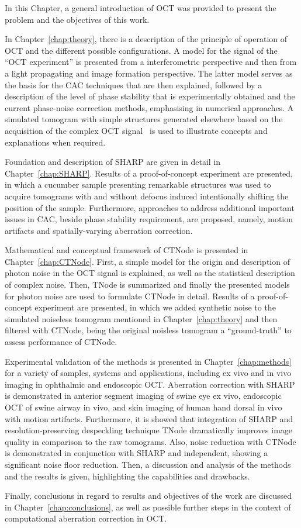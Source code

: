 In this Chapter, a general introduction of OCT was provided to present the problem and the objectives of this work.

In Chapter~\ref{chap:theory}, there is a description of the principle of operation of OCT and the different possible configurations. A model for the signal of the ``OCT experiment'' is presented from a interferometric perspective and then from a light propagating and image formation perspective. The latter model serves as the basis for the CAC techniques that are then explained, followed by a description of the level of phase stability that is experimentally obtained and the current phase-noise correction methods, emphasising in numerical approaches. A simulated tomogram with simple structures generated elsewhere based on the acquisition of the complex OCT signal~\cite{} is used to illustrate concepts and explanations when required.

Foundation and description of SHARP are given in detail in Chapter~\ref{chap:SHARP}. Results of a proof-of-concept experiment are presented, in which a cucumber sample presenting remarkable structures was used to acquire tomograms with and without defocus induced intentionally shifting the position of the sample. Furthermore, approaches to address additional important issues in CAC, beside phase stability requirement, are proposed, namely, motion artifacts and spatially-varying aberration correction.

Mathematical and conceptual framework of CTNode is presented in Chapter~\ref{chap:CTNode}. First, a simple model for the origin and description of photon noise in the OCT signal is explained, as well as the statistical description of complex noise. Then, TNode is summarized and finally the presented models for photon noise are used to formulate CTNode in detail. Results of a proof-of-concept experiment are presented, in which we added synthetic noise to the simulated noiseless tomogram mentioned in Chapter~\ref{chap:theory} and then filtered with CTNode, being the original noisless tomogram a ``ground-truth'' to assess performance of CTNode.

Experimental validation of the methods is presented in Chapter~\ref{chap:methods} for a variety of samples, systems and applications, including ex vivo and in vivo imaging in ophthalmic and endoscopic OCT. Aberration correction with SHARP is demonstrated in anterior segment imaging of swine eye ex vivo, endoscopic OCT of swine airway in vivo, and skin imaging of human hand dorsal in vivo with motion artifacts. Furthermore, it is showed that integration of SHARP and resolution-preserving despeckling technique TNode dramatically improves image quality in comparison to the raw tomograms. Also, noise reduction with CTNode is demonstrated in conjunction with SHARP and independent, showing a significant noise floor reduction. Then, a discussion and analysis of the methods and the results is given, highlighting the capabilities and drawbacks.

Finally, conclusions in regard to results and objectives of the work are discussed in Chapter~\ref{chap:conclusions}, as well as possible further steps in the context of computational aberration correction in OCT.